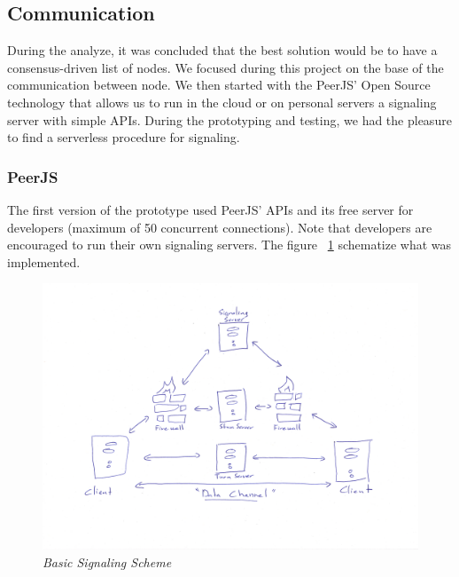 
\subsection{Communication}

During the analyze, it was concluded that the best solution would be to have a consensus-driven list of nodes. We focused during this project on the base of the communication between node. We then started with the PeerJS' Open Source technology that allows us to run in the cloud or on personal servers a signaling server with simple APIs. During the prototyping and testing, we had the pleasure to find a serverless procedure for signaling.

\subsubsection{PeerJS} The first version of the prototype used PeerJS' APIs and its free server for developers (maximum of 50 concurrent connections). Note that developers are encouraged to run their own signaling servers. The figure ~\ref{img:basic-signaling} schematize what was implemented.
\begin{figure}[htpb]
\centering
\caption{\small \sl Basic Signaling Scheme
\label{img:basic-signaling}}
\begin{adjustbox}{center}
\includegraphics[scale=0.1]{annexes/schemes/signaling-basic.jpg}
\end{adjustbox}
\end{figure} 

